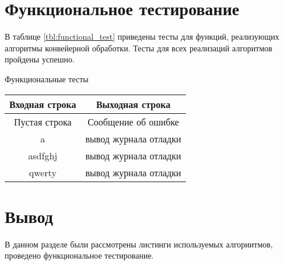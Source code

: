 \newpage
\section{Функциональное тестирование}

В таблице \ref{tbl:functional_test} приведены тесты для функций, реализующих алгоритмы конвейерной обработки. Тесты для всех реализаций алгоритмов пройдены успешно.
	\begin{center}

				\begin{threeparttable}
					\captionsetup{justification=raggedright,singlelinecheck=off}
					\caption{\label{tbl:functional_test} Функциональные тесты}
					\begin{tabular}{|c|c|}
						\hline
						Входная строка & Выходная строка \\
						\hline
						Пустая строка & Сообщение об ошибке\\
						\hline
						a & вывод журнала отладки\\
						\hline
						asdfghj & вывод журнала отладки\\
						\hline
						qwerty & вывод журнала отладки\\
						\hline
					\end{tabular}
				\end{threeparttable}
	\end{center}



\section*{Вывод}
В данном разделе были рассмотрены листинги используемых алгориитмов, проведено функциональное тестирование.
